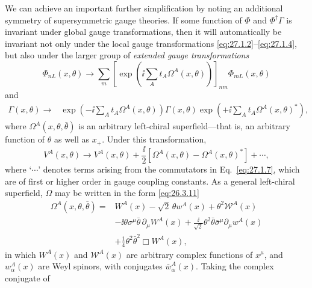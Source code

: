 We can achieve an important further simplification by noting an additional
symmetry of supersymmetric gauge theories. If some function of \(\Phi\)
and \(\Phi^\dagger\Gamma\) is invariant under global gauge transformations,
then it will automatically be invariant not only under the local gauge
transformations \eqref{eq:27.1.2}--\eqref{eq:27.1.4}, but also under the
larger group of \textit{extended gauge transformations}
\begin{equation}
  \Phi_{nL}(x,\theta)\longrightarrow
  \sum_m\left[
    \exp\left(\ii\sum_A t_A\Omega^A(x,\theta)\right)
  \right]_{nm}\Phi_{mL}(x,\theta)
  \tag{27.1.11}\label{eq:27.1.11}
\end{equation}
and
\begin{equation}
  \begin{split}
  \Gamma(x,\theta)\longrightarrow{}&
  \exp\left(-\ii\sum_A t_A\Omega^A(x,\theta)\right)
  \Gamma(x,\theta)
  \exp\left(+\ii\sum_A t_A\Omega^A(x,\theta)^*\right),
  \end{split}
  \tag{27.1.12}\label{eq:27.1.12}
\end{equation}
where \(\Omega^A(x,\theta,\bar\theta)\) is an arbitrary left-chiral
superfield---that is, an arbitrary function of \(\theta\) as well as
\(x_+\). Under this
transformation,
\begin{equation}
  V^A(x,\theta)\longrightarrow
  V^A(x,\theta)
  +\frac{\ii}{2}\left[
    \Omega^A(x,\theta)-\Omega^A(x,\theta)^*
  \right]+\cdots,
  \tag{27.1.13}\label{eq:27.1.13}
\end{equation}
where `\(\cdots\)' denotes terms arising from the commutators in
Eq.~\eqref{eq:27.1.7}, which are of first or higher order in gauge coupling
constants. As a general left-chiral superfield, \(\Omega\) may be written
in the form \eqref{eq:26.3.11}
\begin{equation}
  \begin{aligned}
  \Omega^A(x,\theta,\bar\theta)={}&
  W^A(x)
  -\sqrt{2}\,\theta w^A(x)
  +\theta^2\mathcal{W}^A(x)
  \\
  &-\ii\theta\sigma^\mu\bar\theta\,\partial_\mu W^A(x)
  +\frac{\ii}{\sqrt{2}}\theta^2
    \bar\theta\bar\sigma^\mu\partial_\mu w^A(x)
  \\
  &+\frac14\theta^2\bar\theta^2\Box W^A(x),
  \end{aligned}
  \tag{27.1.14}\label{eq:27.1.14}
\end{equation}
in which \(W^A(x)\) and \(\mathcal{W}^A(x)\) are arbitrary complex
functions of \(x^\mu\), and \(w^A_\alpha(x)\) are Weyl spinors, with
conjugates \(\bar w^A_{\dot\alpha}(x)\). Taking the complex conjugate of
